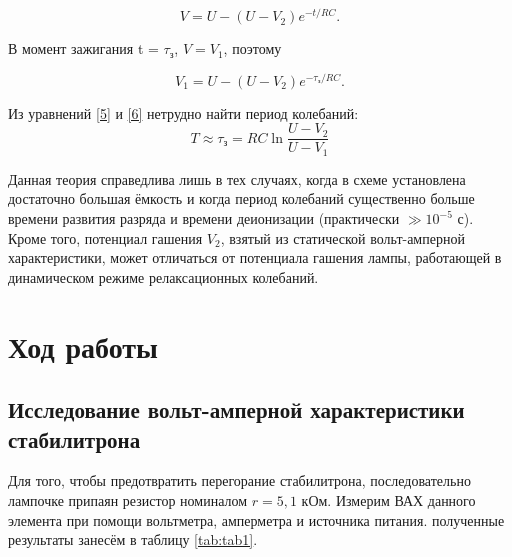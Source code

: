 \documentclass[a4paper,12pt]{article} %
\begin{document}
\begin{equation}\label{5}
V = U - (U - V_2)e^{-t/RC}.
\end{equation}

В момент зажигания t = $ \tau_\text{з} $, $ V = V_1 $, поэтому

\begin{equation}\label{6}
V_1=U-(U-V_2)e^{-\tau_\text{з}/RC}.
\end{equation}

Из уравнений \eqref{5} и \eqref{6} нетрудно найти период колебаний:
\label{form}
\begin{equation}\label{7}
T\approx\tau_\text{з}=RC\ln\frac{U-V_2}{U-V_1}
\end{equation}

Данная теория справедлива лишь в тех случаях, когда в схеме установлена достаточно большая ёмкость и когда период колебаний существенно больше времени развития разряда и времени деионизации (практически $ \gg 10^{-5} $ с). Кроме того, потенциал гашения $ V_2 $, взятый из статической вольт-амперной характеристики, может отличаться от потенциала гашения лампы, работающей в динамическом режиме релаксационных колебаний.

\section{Ход работы}

\subsection{Исследование вольт-амперной характеристики стабилитрона}

Для того, чтобы предотвратить перегорание стабилитрона, последовательно лампочке припаян резистор номиналом $ r = 5,1 $ кОм. Измерим ВАХ данного элемента при помощи вольтметра, амперметра и источника питания. полученные результаты занесём в таблицу \ref{tab:tab1}.
\end{document}
